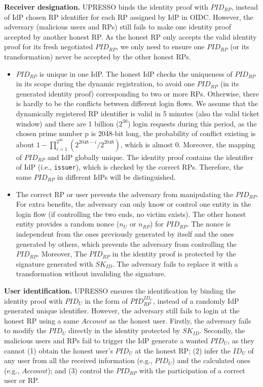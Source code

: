 \vspace{1mm}\noindent\textbf{Receiver designation.} UPRESSO binds the identity proof with $PID_{RP}$, instead of IdP chosen RP identifier for each RP assigned by IdP in OIDC. However, the adversary (malicious users and RPs) still fails to  make one identity proof 
accepted by another honest RP. As the honest RP only accepts the valid identity proof for its fresh negotiated $PID_{RP}$, we only need to ensure one $PID_{RP}$ (or its transformation) never be accepted by the other honest RPs.
\begin{itemize}
\item $PID_{RP}$ is unique in one IdP. The honest IdP checks the uniqueness of $PID_{RP}$ in its scope during the dynamic registration, to avoid one $PID_{RP}$ (in its generated identity proof) corresponding to two or more RPs. Otherwise, there is hardly to be the conflicts between different login flows. We assume that the dynamically registered RP identifier is valid in 5 minutes (also the valid ticket window) and there are 1 billion ($2^{30}$) login requests during this period, as the chosen prime number p is 2048-bit long, the probability of conflict existing is about $1-\prod_{i=1}^{2^{30}}(2^{2048-i}/2^{2048})$, which is almost 0. Moreover, the mapping of $PID_{RP}$ and IdP globally unique. The identity proof contains the identifier of IdP (i.e., \verb+issuer+), which is checked by the correct RPs. Therefore, the same $PID_{RP}$ in different IdPs will be distinguished.

\item The correct RP or user prevents the adversary from manipulating the $PID_{RP}$. For extra benefits, the adversary can only know or control one entity in the login flow (if controlling the two ends, no victim exists). The other honest entity provides a random nonce ($n_U$ or $n_{RP}$) for $PID_{RP}$. The nonce is independent from the ones previously generated by itself  and the ones generated by others, which prevents the adversary from controlling the $PID_{RP}$. Moreover, The $PID_{RP}$ in the identity proof is protected by the signature generated with $SK_{ID}$. The adversary fails to replace it with a transformation without invaliding the signature.

\end{itemize}

\vspace{1mm}\noindent\textbf{User identification.} UPRESSO ensures the identification by binding the identity proof with $PID_U$  in the form of $PID_{RP}^{ID_U}$, instead of a randomly IdP generated unique identifier. However, the adversary still fails to login at the honest RP using a same $Account$ as the honest user. Firstly, the adversary fails to  modify the $PID_U$ directly in the identity protected by $SK_{ID}$. Secondly, the malicious users and RPs fail to trigger the IdP generate a wanted $PID_U$, as they cannot (1) obtain the honest user's $PID_U$ at the honest RP; (2) infer the $ID_U$ of any user from all the received  information (e.g., $PID_U$) and the calculated ones (e.g., $Account$); and (3) control the $PID_{RP}$ with the participation of a correct user or RP.


